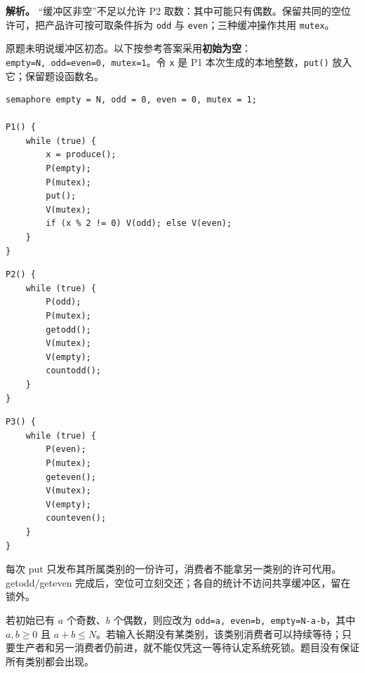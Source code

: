 
\textbf{解析。} ``缓冲区非空''不足以允许 P2 取数：其中可能只有偶数。保留共同的空位许可，把产品许可按可取条件拆为 \texttt{odd} 与 \texttt{even}；三种缓冲操作共用 \texttt{mutex}。

原题未明说缓冲区初态。以下按参考答案采用\textbf{初始为空}：\texttt{empty=N,}\allowbreak{}\texttt{\ odd=even=0,}\allowbreak{}\texttt{\ mutex=1}。令 \texttt{x} 是 P1 本次生成的本地整数，\texttt{put()} 放入它；保留题设函数名。

\par\medskip\noindent
\begin{minipage}{\linewidth}
\begin{verbatim}
semaphore empty = N, odd = 0, even = 0, mutex = 1;

P1() {
    while (true) {
        x = produce();
        P(empty);
        P(mutex);
        put();
        V(mutex);
        if (x % 2 != 0) V(odd); else V(even);
    }
}
\end{verbatim}
\end{minipage}\par\medskip

\par\medskip\noindent
\begin{minipage}{\linewidth}
\begin{verbatim}
P2() {
    while (true) {
        P(odd);
        P(mutex);
        getodd();
        V(mutex);
        V(empty);
        countodd();
    }
}
\end{verbatim}
\end{minipage}\par\medskip

\par\medskip\noindent
\begin{minipage}{\linewidth}
\begin{verbatim}
P3() {
    while (true) {
        P(even);
        P(mutex);
        geteven();
        V(mutex);
        V(empty);
        counteven();
    }
}
\end{verbatim}
\end{minipage}\par\medskip

每次 put 只发布其所属类别的一份许可，消费者不能拿另一类别的许可代用。getodd/geteven 完成后，空位可立刻交还；各自的统计不访问共享缓冲区，留在锁外。

若初始已有 \(a\) 个奇数、\(b\) 个偶数，则应改为 \texttt{odd=a,}\allowbreak{}\texttt{\ even=b,}\allowbreak{}\texttt{\ empty=N-a-b}，其中 \(a,b\ge0\) 且 \(a+b\le N\)。若输入长期没有某类别，该类别消费者可以持续等待；只要生产者和另一消费者仍前进，就不能仅凭这一等待认定系统死锁。题目没有保证所有类别都会出现。

